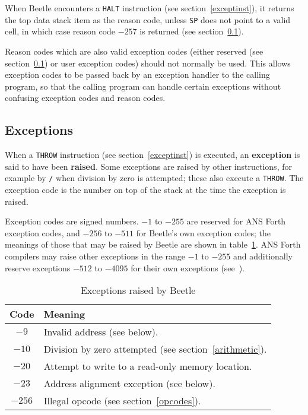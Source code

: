 \documentclass{article}
\begin{document}
When Beetle encounters a {\tt HALT} instruction (see section~\ref{exceptinst}),
it returns the top data stack item as the reason code, unless {\tt SP} does not
point to a valid cell, in which case reason code $-257$ is returned (see section~\ref{exceptions}).

Reason codes which are also valid exception codes (either reserved (see section~\ref{exceptions})
or user exception codes) should not normally be used. This
allows exception codes to be passed back by an exception handler to the calling
program, so that the calling program can handle certain exceptions without
confusing exception codes and reason codes.


\subsection{Exceptions}
\label{exceptions}

When a {\tt THROW} instruction (see section~\ref{exceptinst}) is executed, an
{\bf exception} is said to have been {\bf raised}. Some exceptions are raised by
other instructions, for example by {\tt /} when division by zero is attempted;
these also execute a {\tt THROW}. The exception code is the number on top of the
stack at the time the exception is raised.

Exception codes are signed numbers. $-1$ to $-255$ are reserved for ANS Forth
exception codes, and $-256$ to $-511$ for Beetle's own exception codes; the meanings
of those that may be raised by Beetle are shown in table~\ref{excepttable}. ANS
Forth compilers may raise other exceptions in the range $-1$ to $-255$ and
additionally reserve exceptions $-512$ to $-4095$ for their own exceptions
(see~\cite[section 9.3.1]{ANSIforth}).

\begin{table}[htbp]
\begin{center}
\begin{tabular}{cl} \toprule
\bf Code & \bf Meaning \\ \midrule
$-9$ & Invalid address (see below). \\
$-10$ & Division by zero attempted (see section~\ref{arithmetic}). \\
$-20$ & Attempt to write to a read-only memory location. \\
$-23$ & Address alignment exception (see below). \\
$-256$ & Illegal opcode (see section~\ref{opcodes}). \\ \bottomrule
\end{tabular}
\caption{\label{excepttable}Exceptions raised by Beetle}
\end{center}
\end{table}
\end{document}
